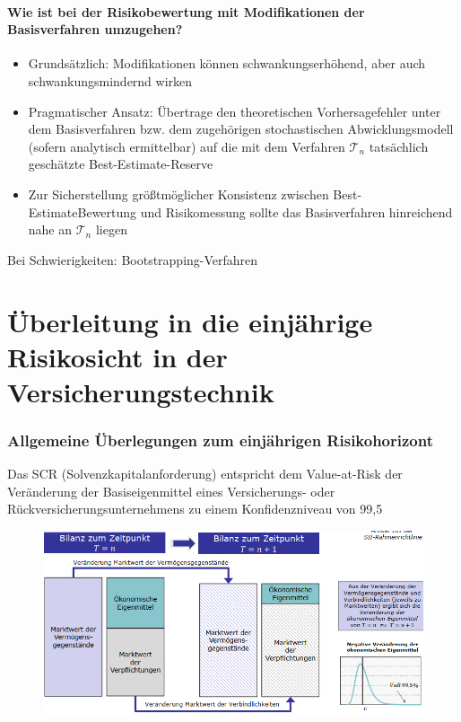 \documentclass[12pt]{report}
\theoremstyle{dotless}
\theoremstyle{definition}
\begin{document}
\subsubsection{Wie ist bei der Risikobewertung mit Modifikationen der
Basisverfahren umzugehen?}
\begin{itemize}
\item Grundsätzlich: Modifikationen können schwankungserhöhend, aber auch
schwankungsmindernd wirken
\item Pragmatischer Ansatz: Übertrage den theoretischen Vorhersagefehler
unter dem Basisverfahren bzw. dem zugehörigen stochastischen
Abwicklungsmodell (sofern analytisch ermittelbar) auf die mit dem Verfahren $\mathcal{T}_n$ tatsächlich geschätzte Best-Estimate-Reserve
\item Zur Sicherstellung größtmöglicher Konsistenz zwischen Best-EstimateBewertung und Risikomessung sollte das Basisverfahren hinreichend nahe
an $\mathcal{T}_n$ liegen
\end{itemize}

Bei Schwierigkeiten: Bootstrapping-Verfahren


\chapter{Überleitung in die einjährige Risikosicht in der Versicherungstechnik}

\subsection{Allgemeine Überlegungen zum einjährigen Risikohorizont}
Das SCR (Solvenzkapitalanforderung) entspricht dem Value-at-Risk der Veränderung der
Basiseigenmittel eines Versicherungs- oder Rückversicherungsunternehmens zu einem
Konfidenzniveau von 99,5 %

\begin{figure}[ht]
	\centering
	\includegraphics[width= \textwidth]{Bilder/SCR.png}
\end{figure}
\end{document}
